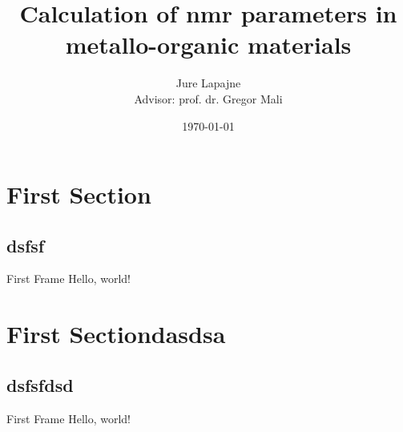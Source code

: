 \documentclass[slovene, usenames, dvipsnames]{beamer}
\title{Calculation of nmr parameters in metallo-organic materials}
\author[Jure Lapajne]{Jure Lapajne\\{\small Advisor: prof. dr. Gregor Mali}}
\date{\today}
\begin{document}
	
	\frame{\titlepage}
	\setlength{\abovedisplayskip}{3pt}
	\setlength{\belowdisplayskip}{3pt}

  \section{First Section}
  \subsection{dsfsf}
  \begin{frame}{First Frame}
    Hello, world!
  \end{frame}

    \section{First Sectiondasdsa}
  \subsection{dsfsfdsd}
  \begin{frame}{First Frame}
    Hello, world!
  \end{frame}
  
\end{document}
